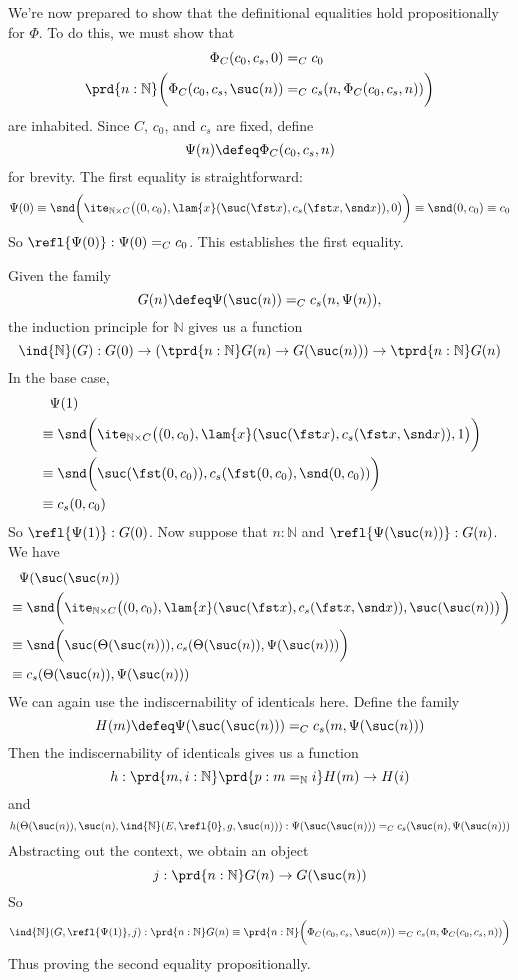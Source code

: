 We're now prepared to show that the definitional equalities hold
propositionally for $\Phi$.  To do this, we must show that
\begin{align*}
  \Phi_{C}(c_{0}, c_{s}, 0) &=_{C} c_{0} \\
  \prd{n:\mathbb{N}}\bigg(\Phi_{C}(c_{0}, c_{s}, \suc(n)) &=_{C} c_{s}(n,
  \Phi_{C}(c_{0}, c_{s}, n)) \bigg)
\end{align*}
are inhabited.  Since $C$, $c_{0}$, and $c_{s}$ are fixed, define
\[
  \Psi(n) \defeq \Phi_{C}(c_{0}, c_{s}, n)
\]
for brevity. The first equality is straightforward:
\[
  \Psi(0)
  \equiv
  \snd\bigg(
    \ite_{\mathbb{N} \times C}\big(
    (0, c_{0}),
    \lam{x}(\suc(\fst x), c_{s}(\fst x, \snd x)),
    0
    \big)
  \bigg)
  \equiv
  \snd(0, c_{0})
  \equiv
  c_{0}
\]
So $\refl{\Psi(0)} : \Psi(0) =_{C} c_{0}$.  This establishes
the first equality.  

Given the family
\[
  G(n) \defeq
  \Psi(\suc(n)) =_{C} c_{s}(n, \Psi(n)),
\]
the induction principle for $\mathbb{N}$ gives us a function
\[
  \ind{\mathbb{N}}(G) :
  G(0) \to \left(\tprd{n:\mathbb{N}} G(n) \to G(\suc(n))\right) \to
  \tprd{n:\mathbb{N}} G(n)
\]
In the base case,
\begin{align*}
  &\phantom{\equiv} \Psi(1)
  \\&\equiv
  \snd\bigg(
    \ite_{\mathbb{N} \times C}\big(
    (0, c_{0}),
    \lam{x}(\suc(\fst x), c_{s}(\fst x, \snd x)),
    1
    \big)
  \bigg)
  \\&\equiv
  \snd\bigg(
    \suc(\fst (0, c_{0})), c_{s}(\fst (0, c_{0}), \snd (0, c_{0}))
  \bigg)
  \\&\equiv
  c_{s}(0, c_{0})
\end{align*}
So $\refl{\Psi(1)} : G(0)$.  Now suppose that $n : \mathbb{N}$ and
$\refl{\Psi(\suc(n))} : G(n)$.  We have
\begin{align*}
  &\phantom{\equiv}\Psi(\suc(\suc(n))
  \\&\equiv
  \snd\bigg(
    \ite_{\mathbb{N} \times C}\big(
    (0, c_{0}),
    \lam{x}(\suc(\fst x), c_{s}(\fst x, \snd x)),
    \suc(\suc(n))
    \big)
  \bigg)
  \\&\equiv
  \snd\bigg(
    \suc(\Theta(\suc(n))), c_{s}(\Theta(\suc(n)), \Psi(\suc(n)))
  \bigg)
  \\&\equiv
  c_{s}(\Theta(\suc(n)), \Psi(\suc(n)))
\end{align*}
We can again use the indiscernability of identicals here.  Define the family
\[
  H(m) \defeq \Psi(\suc(\suc(n))) =_{C} c_{s}(m, \Psi(\suc(n))) 
\]
Then the indiscernability of identicals gives us a function
\[
  h: \prd{m, i : \mathbb{N}}\prd{p: m=_{\mathbb{N}} i} H(m) \to H(i)
\]
and
\[
  h(\Theta(\suc(n)), \suc(n), \ind{\mathbb{N}}(E, \refl{0}, g, \suc(n)))
  :
  \Psi(\suc(\suc(n))) =_{C} c_{s}(\suc(n), \Psi(\suc(n)))
\]
Abstracting out the context, we obtain an object
\[
  j : \prd{n:\mathbb{N}} G(n) \to G(\suc(n))
\]
So
\[
  \ind{\mathbb{N}}(G, \refl{\Psi(1)}, j) : \prd{n:\mathbb{N}} G(n)
  \equiv
  \prd{n:\mathbb{N}}\bigg(\Phi_{C}(c_{0}, c_{s}, \suc(n)) =_{C} c_{s}(n,
  \Phi_{C}(c_{0}, c_{s}, n)) \bigg)
\]
Thus proving the second equality propositionally.




